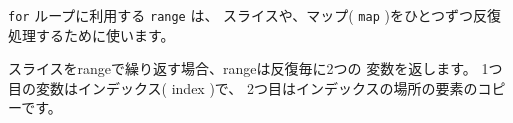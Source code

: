 \texttt{for} ループに利用する \texttt{range} は、
スライスや、マップ( \texttt{map} )をひとつずつ反復処理するために使います。

スライスをrangeで繰り返す場合、rangeは反復毎に2つの
変数を返します。 1つ目の変数はインデックス( index )で、
2つ目はインデックスの場所の要素のコピーです。